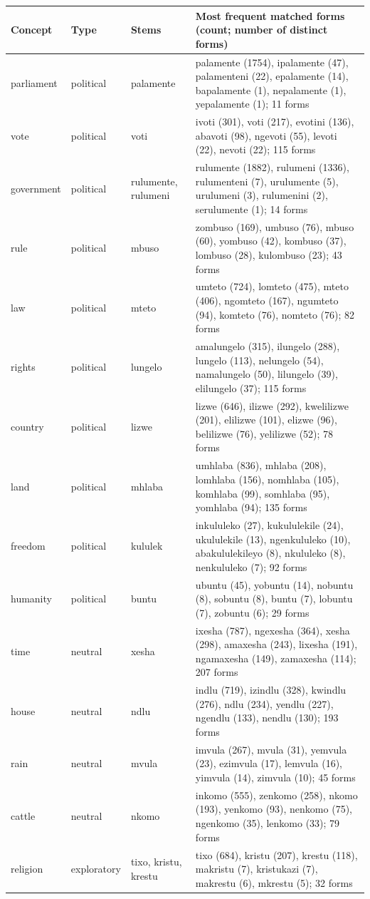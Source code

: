 \begin{tabular}{@{}p{1.9cm}p{1.6cm}p{2.0cm}p{9.6cm}@{}}
\toprule
Concept & Type & Stems & Most frequent matched forms (count; number of distinct forms) \\ \midrule
parliament & political & palamente & palamente (1754), ipalamente (47), palamenteni (22), epalamente (14), bapalamente (1), nepalamente (1), yepalamente (1); 11 forms \\
vote & political & voti & ivoti (301), voti (217), evotini (136), abavoti (98), ngevoti (55), levoti (22), nevoti (22); 115 forms \\
government & political & rulumente, rulumeni & rulumente (1882), rulumeni (1336), rulumenteni (7), urulumente (5), urulumeni (3), rulumenini (2), serulumente (1); 14 forms \\
rule & political & mbuso & zombuso (169), umbuso (76), mbuso (60), yombuso (42), kombuso (37), lombuso (28), kulombuso (23); 43 forms \\
law & political & mteto & umteto (724), lomteto (475), mteto (406), ngomteto (167), ngumteto (94), komteto (76), nomteto (76); 82 forms \\
rights & political & lungelo & amalungelo (315), ilungelo (288), lungelo (113), nelungelo (54), namalungelo (50), lilungelo (39), elilungelo (37); 115 forms \\
country & political & lizwe & lizwe (646), ilizwe (292), kwelilizwe (201), elilizwe (101), elizwe (96), belilizwe (76), yelilizwe (52); 78 forms \\
land & political & mhlaba & umhlaba (836), mhlaba (208), lomhlaba (156), nomhlaba (105), komhlaba (99), somhlaba (95), yomhlaba (94); 135 forms \\
freedom & political & kululek & inkululeko (27), kukululekile (24), ukululekile (13), ngenkululeko (10), abakululekileyo (8), nkululeko (8), nenkululeko (7); 92 forms \\
humanity & political & buntu & ubuntu (45), yobuntu (14), nobuntu (8), sobuntu (8), buntu (7), lobuntu (7), zobuntu (6); 29 forms \\
time & neutral & xesha & ixesha (787), ngexesha (364), xesha (298), amaxesha (243), lixesha (191), ngamaxesha (149), zamaxesha (114); 207 forms \\
house & neutral & ndlu & indlu (719), izindlu (328), kwindlu (276), ndlu (234), yendlu (227), ngendlu (133), nendlu (130); 193 forms \\
rain & neutral & mvula & imvula (267), mvula (31), yemvula (23), ezimvula (17), lemvula (16), yimvula (14), zimvula (10); 45 forms \\
cattle & neutral & nkomo & inkomo (555), zenkomo (258), nkomo (193), yenkomo (93), nenkomo (75), ngenkomo (35), lenkomo (33); 79 forms \\
religion & exploratory & tixo, kristu, krestu & tixo (684), kristu (207), krestu (118), makristu (7), kristukazi (7), makrestu (6), mkrestu (5); 32 forms \\
\bottomrule
\end{tabular}

